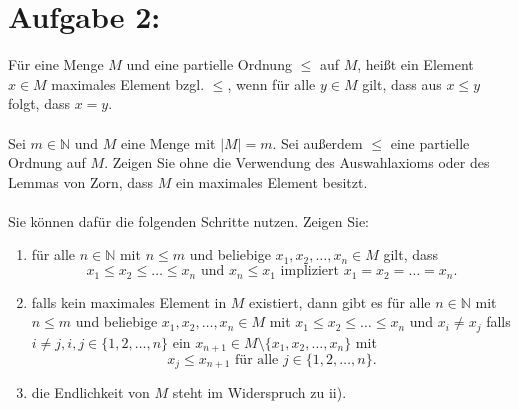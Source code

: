 \documentclass{exam}
\begin{document}
\section*{Aufgabe 2:}
Für eine Menge $M$ und eine partielle Ordnung $\leq$ auf $M$, heißt ein Element $x \in M$ maximales Element bzgl. $\leq$, wenn für alle $y \in M$ gilt, dass aus $x \leq y$ folgt, dass $x = y$.
\\\\
Sei $m \in \mathbb{N}$ und $M$ eine Menge mit $|M| = m$. Sei außerdem $\leq$ eine partielle Ordnung auf $M$. Zeigen Sie ohne die Verwendung des Auswahlaxioms oder des Lemmas von Zorn, dass $M$ ein maximales Element besitzt.
\\\\
Sie können dafür die folgenden Schritte nutzen. Zeigen Sie:
\begin{enumerate}[label=\roman*)]
	\item
	      für alle $n \in \mathbb{N}$ mit $n \leq m$ und beliebige $x_1, x_2, \ldots, x_n \in M$ gilt, dass \[
		      x_1 \leq x_2 \leq \ldots \leq x_n \text{ und }x_n \leq x_1 \text{ impliziert } x_1 = x_2 = \ldots = x_n.
	      \]
	\item
	      falls kein maximales Element in $M$ existiert, dann gibt es für alle $n \in \mathbb{N}$ mit $n \leq m$ und beliebige $x_1, x_2, \ldots, x_n \in M$ mit $x_1 \leq x_2 \leq \ldots \leq x_n$ und $x_i \neq x_j$ falls $i \neq j,
		      i, j \in \{1, 2, \ldots, n\}$ ein $x_{n+1} \in M \setminus \{x_1, x_2, \ldots, x_n\}$ mit \[
		      x_j \leq x_{n+1} \text{ für alle } j \in \{1, 2, \ldots, n\}.
	      \]
	\item
	      die Endlichkeit von $M$ steht im Widerspruch zu ii).
\end{enumerate}
\end{document}

